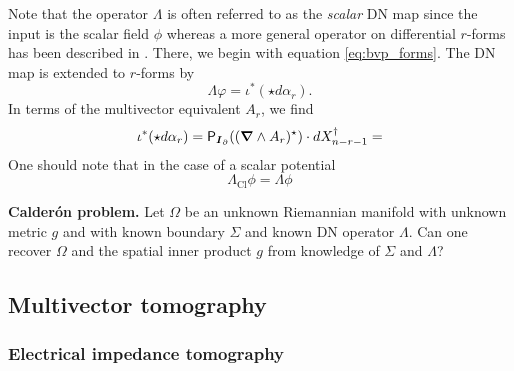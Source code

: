 Note that the operator $\Lambda$ is often referred to as the \emph{scalar} DN map since the input is the scalar field $\phi$ whereas a more general operator on differential $r$-forms has been described in \cite{belishev_dirichlet_2008,sharafutdinov_complete_2013}. There, we begin with equation \cref{eq:bvp_forms}. The DN map is extended to $r$-forms by
\begin{equation}
\Lambda \varphi = \iota^* (\star d \alpha_r).
\end{equation}
In terms of the multivector equivalent $A_r$, we find
\begin{equation}
\iota^*(\star d \alpha_r) = \mathsf{P}_{\boldsymbol{I}_\partial} ((\boldsymbol{\nabla} \wedge A_r)^\star )\cdot dX_{n-r-1}^\dagger = 
\end{equation}
 One should note that in the case of a scalar potential 
\begin{equation}
\Lambda_\textrm{Cl} \phi = \Lambda \phi
\end{equation}

\vspace*{5pt}
\noindent\textbf{Calder\'on problem.} Let $\Omega$ be an unknown Riemannian manifold with unknown metric $g$ and with known boundary $\Sigma$ and known DN operator $\Lambda$. Can one recover $\Omega$ and the spatial inner product $g$ from knowledge of $\Sigma$ and $\Lambda$?
\vspace*{5pt}

\subsection{Multivector tomography}

\subsubsection{Electrical impedance tomography}

